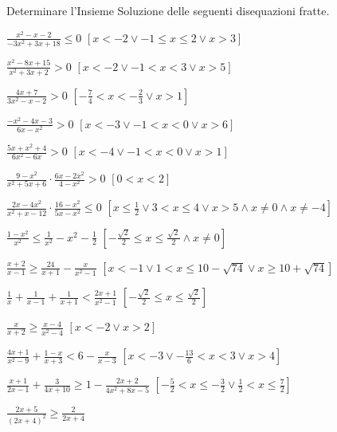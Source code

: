 \begin{esercizio}[\Ast]
 \label{ese:4.64}
Determinare l'Insieme Soluzione delle seguenti disequazioni fratte.
\begin{enumeratea}
\item $\frac{x^2-x-2}{-3x^2+3x+18}\le 0$ 
 \hfill $\left[x<-2\vee -1\le x\le 2\vee x>3\right]$
\item $\frac{x^2-8x+15}{x^2+3x+2}>0$ 
 \hfill $\left[x<-2\vee -1<x<3\vee x>5\right]$
\item $\frac{4x+7}{3x^2-x-2}>0$ 
 \hfill $\left[-\frac 7 4<x<-\frac 2 3\vee x>1\right]$
\item $\frac{-x^2-4x-3}{6x-x^2}>0$ 
 \hfill $\left[x<-3\vee -1<x<0\vee x>6\right]$
\item $\frac{5x+x^2+4}{6x^2-6x}>0$ 
 \hfill $\left[x<-4\vee -1<x<0\vee x>1\right]$
\item $\frac{9-x^2}{x^2+5x+6}\cdot \frac{6x-2x^2}{4-x^2}>0$ 
 \hfill $\left[0<x<2\right]$
\item $\frac{2x-4x^2}{x^2+x-12}\cdot \frac{16-x^2}{5x-x^2}\le 0$ 
 \hfill $\left[x\le \frac 1 2\vee 3<x\le 4\vee x>5 \wedge 
 x\neq 0 \wedge x\neq -4\right]$
\item $\frac{1-x^2}{x^2}\le \frac 1{x^2}-x^2-\frac 1 2$ 
 \hfill $\left[-\frac{\sqrt 2} 2\le x\le \frac{\sqrt 2} 2 \wedge 
 x\neq 0\right]$
\item $\frac{x+2}{x-1}\ge \frac{24}{x+1}-\frac x{x^2-1}$ 
 \hfill $\left[x<-1\vee 1<x\le 10-\sqrt{74}\vee x\ge 10+\sqrt{74}\right]$
\item $\frac 1 x+\frac 1{x-1}+\frac 1{x+1}<\frac{2x+1}{x^2-1}$ 
 \hfill $\left[-\frac{\sqrt 2} 2\le x\le \frac{\sqrt 2} 2\right]$
\item $\frac x{x+2}\ge \frac{x-4}{x^2-4}$ 
 \hfill $\left[x<-2\vee x>2\right]$
\item $\frac{4x+1}{x^2-9}+\frac{1-x}{x+3}<6-\frac x{x-3}$ 
 \hfill $\left[x<-3\vee -\frac{13} 6<x<3\vee x>4\right]$
\item $\frac{x+1}{2x-1}+\frac 3{4x+10}\ge 1-\frac{2x+2}{4x^2+8x-5}$ 
 \hfill $\left[-\frac 5 2<x\le -\frac 3 2\vee \frac 1 2<x\le \frac 7 2\right]$
\item $\frac{2x+5}{(2x+4)^2}\ge \frac 2{2x+4}$ 

\end{enumeratea}
\end{esercizio}
